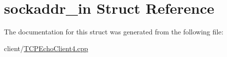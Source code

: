 \hypertarget{structsockaddr__in}{}\section{sockaddr\+\_\+in Struct Reference}
\label{structsockaddr__in}


The documentation for this struct was generated from the following file\+:\begin{DoxyCompactItemize}
\item 
client/\hyperlink{TCPEchoClient4_8cpp}{T\+C\+P\+Echo\+Client4.\+cpp}\end{DoxyCompactItemize}
